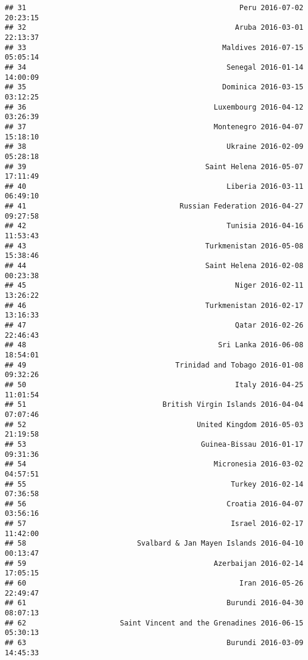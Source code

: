 \documentclass[
]{article}
\begin{document}
\begin{verbatim}
## 31                                                  Peru 2016-07-02 20:23:15
## 32                                                 Aruba 2016-03-01 22:13:37
## 33                                              Maldives 2016-07-15 05:05:14
## 34                                               Senegal 2016-01-14 14:00:09
## 35                                              Dominica 2016-03-15 03:12:25
## 36                                            Luxembourg 2016-04-12 03:26:39
## 37                                            Montenegro 2016-04-07 15:18:10
## 38                                               Ukraine 2016-02-09 05:28:18
## 39                                          Saint Helena 2016-05-07 17:11:49
## 40                                               Liberia 2016-03-11 06:49:10
## 41                                    Russian Federation 2016-04-27 09:27:58
## 42                                               Tunisia 2016-04-16 11:53:43
## 43                                          Turkmenistan 2016-05-08 15:38:46
## 44                                          Saint Helena 2016-02-08 00:23:38
## 45                                                 Niger 2016-02-11 13:26:22
## 46                                          Turkmenistan 2016-02-17 13:16:33
## 47                                                 Qatar 2016-02-26 22:46:43
## 48                                             Sri Lanka 2016-06-08 18:54:01
## 49                                   Trinidad and Tobago 2016-01-08 09:32:26
## 50                                                 Italy 2016-04-25 11:01:54
## 51                                British Virgin Islands 2016-04-04 07:07:46
## 52                                        United Kingdom 2016-05-03 21:19:58
## 53                                         Guinea-Bissau 2016-01-17 09:31:36
## 54                                            Micronesia 2016-03-02 04:57:51
## 55                                                Turkey 2016-02-14 07:36:58
## 56                                               Croatia 2016-04-07 03:56:16
## 57                                                Israel 2016-02-17 11:42:00
## 58                          Svalbard & Jan Mayen Islands 2016-04-10 00:13:47
## 59                                            Azerbaijan 2016-02-14 17:05:15
## 60                                                  Iran 2016-05-26 22:49:47
## 61                                               Burundi 2016-04-30 08:07:13
## 62                      Saint Vincent and the Grenadines 2016-06-15 05:30:13
## 63                                               Burundi 2016-03-09 14:45:33

\end{verbatim}
\end{document}
